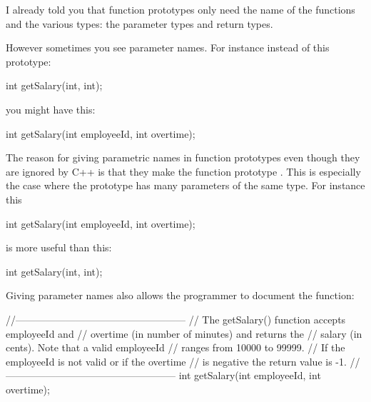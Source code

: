 
\newpage{}

I already told you that function prototypes only need the name of the
functions and the various types: the parameter types and return types.

However sometimes you see parameter names. For instance instead of this
prototype:

\begin{consolethree}[escapeinside=||]
int getSalary(int, int);
\end{consolethree}

you might have this:

\begin{consolethree}[escapeinside=||]
int getSalary(int employeeId, int overtime);
\end{consolethree}

The reason for giving parametric names in function prototypes even
though they are ignored by C++ is that they make the function prototype
. This is especially the case where the
prototype has many parameters of the same type. For instance this

\begin{consolethree}[escapeinside=||]
int getSalary(int employeeId, int overtime);
\end{consolethree}

is more useful than this:

\begin{consolethree}[escapeinside=||]
int getSalary(int, int);
\end{consolethree}

Giving parameter names also allows the programmer to document the
function:

\begin{consolethree}[escapeinside=||]
//---------------------------------------------------
// The getSalary() function accepts employeeId and
// overtime (in number of minutes) and returns the
// salary (in cents). Note that a valid employeeId
// ranges from 10000 to 99999.
// If the employeeId is not valid or if the overtime
// is negative the return value is -1.
//---------------------------------------------------
int getSalary(int employeeId, int overtime);
\end{consolethree}

\newpage{}

